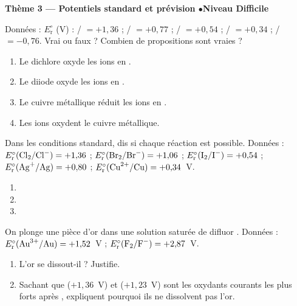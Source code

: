 \documentclass[11pt,a4paper]{article}
\begin{document}
\begin{center}\color{primarydark}\large\bfseries Thème 3 — Potentiels standard et prévision \quad$\bullet$\quad Niveau Difficile\end{center}

\begin{exo}
Données : $E_{\mathrm{r}}^{\circ}$ (V) : / $=+1{,}36$ ;
/ $=+0{,}77$ ; / $=+0{,}54$ ; / $=+0{,}34$ ;
/ $=-0{,}76$. Vrai ou faux ? Combien de propositions sont vraies ?
\begin{enumerate}[label=\alph*)]
  \item Le dichlore  oxyde les ions  en .
  \item Le diiode  oxyde les ions  en .
  \item Le cuivre métallique réduit les ions  en .
  \item Les ions  oxydent le cuivre métallique.
\end{enumerate}
\end{exo}

\begin{exo}
Dans les conditions standard, dis si chaque réaction est possible. Données :
$E_{\mathrm{r}}^{\circ}(\ce{Cl2}/\ce{Cl^-})=+1{,}36$ ; $E_{\mathrm{r}}^{\circ}(\ce{Br2}/\ce{Br^-})
=+1{,}06$ ; $E_{\mathrm{r}}^{\circ}(\ce{I2}/\ce{I^-})=+0{,}54$ ;
$E_{\mathrm{r}}^{\circ}(\ce{Ag+}/\ce{Ag})=+0{,}80$ ; $E_{\mathrm{r}}^{\circ}(\ce{Cu^{2+}}/\ce{Cu})
=+0{,}34$~V.
\begin{enumerate}[label=\alph*)]
  \item {}
  \item {}
  \item {}
\end{enumerate}
\end{exo}

\begin{exo}
On plonge une pièce d'or dans une solution saturée de difluor . Données :
$E_{\mathrm{r}}^{\circ}(\ce{Au^{3+}}/\ce{Au})=+1{,}52$~V ;
$E_{\mathrm{r}}^{\circ}(\ce{F2}/\ce{F^-})=+2{,}87$~V.
\begin{enumerate}[label=\alph*)]
  \item L'or se dissout-il ? Justifie.
  \item Sachant que  ($+1{,}36$~V) et  ($+1{,}23$~V) sont les oxydants courants les plus
        forts après , expliquent pourquoi ils ne dissolvent pas l'or.
\end{enumerate}
\end{exo}
\end{document}
